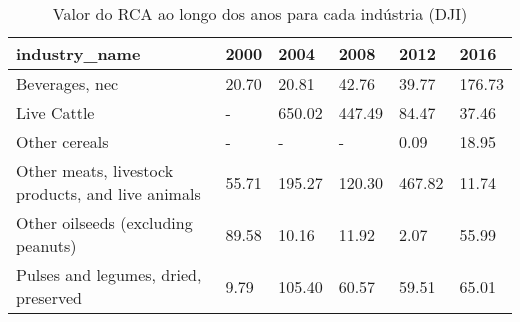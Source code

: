 \begin{table}
\centering
\caption{Valor do RCA ao longo dos anos para cada indústria (DJI)}
\begin{tabular}{p{6cm}p{1.5cm}p{1.5cm}p{1.5cm}p{1.5cm}p{1.5cm}}
\toprule
                                    industry\_name &  2000 &   2004 &   2008 &   2012 &   2016 \\
\midrule
                                   Beverages, nec & 20.70 &  20.81 &  42.76 &  39.77 & 176.73 \\
                                      Live Cattle &     - & 650.02 & 447.49 &  84.47 &  37.46 \\
                                    Other cereals &     - &      - &      - &   0.09 &  18.95 \\
Other meats, livestock products, and live animals & 55.71 & 195.27 & 120.30 & 467.82 &  11.74 \\
               Other oilseeds (excluding peanuts) & 89.58 &  10.16 &  11.92 &   2.07 &  55.99 \\
             Pulses and legumes, dried, preserved &  9.79 & 105.40 &  60.57 &  59.51 &  65.01 \\
\bottomrule
\end{tabular}
\end{table}
